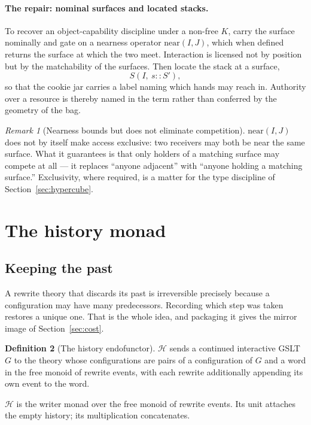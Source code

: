 \documentclass[11pt]{article}
\theoremstyle{definition}
\newtheorem{definition}{Definition}[section]
\theoremstyle{plain}
\theoremstyle{remark}
\newtheorem{remark}[definition]{Remark}
\newcommand{\hist}{\mathcal{H}}
\newcommand{\near}{\mathrm{near}}
\begin{document}
\paragraph{The repair: nominal surfaces and located stacks.} To recover an
object-capability discipline under a non-free $K$, carry the surface nominally and gate on
a nearness operator $\near(I,J)$, which when defined returns the surface at which the two
meet. Interaction is licensed not by position but by the matchability of the surfaces.
Then locate the stack at a surface,
\[
  S(I,\ s :: S') ,
\]
so that the cookie jar carries a label naming which hands may reach in. Authority over a
resource is thereby named in the term rather than conferred by the geometry of the bag.

\begin{remark}[Nearness bounds but does not eliminate competition]
$\near(I,J)$ does not by itself make access exclusive: two receivers may both be near the
same surface. What it guarantees is that only holders of a matching surface may compete
at all --- it replaces ``anyone adjacent'' with ``anyone holding a matching surface.''
Exclusivity, where required, is a matter for the type discipline of
Section~\ref{sec:hypercube}.
\end{remark}

\section{The history monad}
\label{sec:history}

\subsection{Keeping the past}

A rewrite theory that discards its past is irreversible precisely because a configuration
may have many predecessors. Recording which step was taken restores a unique one. That is
the whole idea, and packaging it gives the mirror image of Section~\ref{sec:cost}.

\begin{definition}[The history endofunctor]
$\hist$ sends a continued interactive GSLT $G$ to the theory whose configurations are
pairs of a configuration of $G$ and a word in the free monoid of rewrite events, with
each rewrite additionally appending its own event to the word.
\end{definition}

$\hist$ is the writer monad over the free monoid of rewrite events. Its unit attaches
the empty history; its multiplication concatenates.
\end{document}
